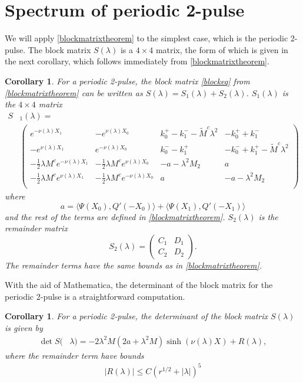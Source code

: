 \documentclass[11pt,reqno]{amsart}
\theoremstyle{plain}
\newtheorem{corollary}[theorem]{Corollary}
\theoremstyle{definition}
\theoremstyle{remark}
\begin{document}
\section{Spectrum of periodic 2-pulse}\label{sec:per2peig}

We will apply \cref{blockmatrixtheorem} to the simplest case, which is the periodic 2-pulse. The block matrix $S(\lambda)$ is a $4\times 4$ matrix, the form of which is given in the next corollary, which follows immediately from \cref{blockmatrixtheorem}.

\begin{corollary}\label{corr:2blockmatrix}
For a periodic 2-pulse, the block matrix \cref{blockeq} from \cref{blockmatrixtheorem} can be written as $S(\lambda) = S_1(\lambda) + S_2(\lambda)$. $S_1(\lambda)$ is the $4 \times 4$ matrix
\begin{align}
S&_1(\lambda) = \\
&\begin{pmatrix}
e^{-\nu(\lambda)X_1} & -e^{\nu(\lambda)X_0} & k_0^+ - k_1^- -\tilde{M}^c \lambda^2 & -k_0^+ + k_1^- \\
-e^{\nu(\lambda)X_1} & e^{-\nu(\lambda)X_0} & k_0^- - k_1^+ & -k_0^- + k_1^+-\tilde{M}^c \lambda^2 \\
-\frac{1}{2}\lambda M^c e^{-\nu(\lambda)X_1} & -\frac{1}{2}\lambda M^ce^{\nu(\lambda)X_0} &-a-\lambda^2 M_2 & a \\
-\frac{1}{2}\lambda M^c e^{\nu(\lambda)X_1} & -\frac{1}{2}\lambda M^c e^{-\nu(\lambda)X_0}  & a & -a-\lambda^2 M_2 \\
\end{pmatrix}
\end{align}
where
\begin{equation}\label{2pa}
a = \langle \Psi(X_0), Q'(-X_0) \rangle + \langle \Psi(X_1), Q'(-X_1) \rangle
\end{equation}
and the rest of the terms are defined in \cref{blockmatrixtheorem}. $S_2(\lambda)$ is the remainder matrix
\[
S_2(\lambda) = \begin{pmatrix} C_1 & D_1 \\ C_2 & D_2 \end{pmatrix}.
\]
The remainder terms have the same bounds as in \cref{blockmatrixtheorem}.
\end{corollary}

With the aid of Mathematica, the determinant of the block matrix for the periodic 2-pulse is a straightforward computation.

\begin{corollary}\label{corr:2perDet1}
For a periodic 2-pulse, the determinant of the block matrix $S(\lambda)$ is given by
\begin{equation*}
\begin{aligned}
\det S(&\lambda) = -2 \lambda^2 M (2a + \lambda^2 M) \sinh(\nu(\lambda)X) + R(\lambda),
\end{aligned}
\end{equation*}
where the remainder term have bounds
\begin{align*}
|R(\lambda)| \leq C(r^{1/2} + |\lambda|)^5
\end{align*}
\end{corollary}
\end{document}
